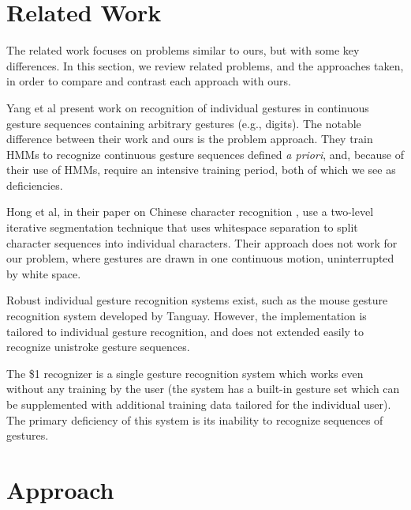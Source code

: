 \documentclass[twoside]{article}
\begin{document}
\begin{multicols}{2}
\section{Related Work}

The related work focuses on problems similar to ours, but with some key
differences. In this section, we review related problems, and the
approaches taken, in order to compare and contrast each approach with ours.

Yang et al \cite{yang_gesture_1994} present work on recognition of individual
gestures in continuous gesture sequences containing arbitrary gestures (e.g.,
digits). The notable difference between their work and ours is the problem
approach. They train HMMs to recognize continuous gesture sequences defined
\textit{a priori}, and, because of their use of HMMs, require an intensive
training period, both of which we see as deficiencies.

Hong et al, in their paper on Chinese character recognition
\cite{hong1998segmentation}, use a two-level iterative segmentation technique
that uses whitespace separation to split character sequences into individual
characters. Their approach does not work for our problem, where gestures are drawn in one
continuous motion, uninterrupted by white space.

Robust individual gesture recognition systems exist, such as the mouse gesture
recognition system developed by Tanguay\cite{tanguay_jr_hidden_1995}. However,
the implementation is tailored to individual gesture recognition, and does not
extended easily to recognize unistroke gesture sequences.

The \$1 recognizer \cite{wobbrock2007gestures} is a single gesture recognition
system which works even without any training by the user (the system has a
built-in gesture set which can be supplemented with additional training data
tailored for the individual user). The primary deficiency of this system is its
inability to recognize sequences of gestures.

\section{Approach}



\end{multicols}
\end{document}
